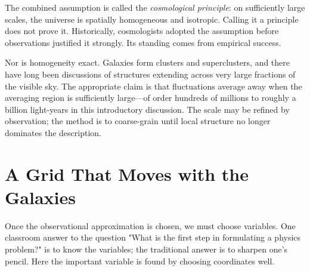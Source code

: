 \begin{classroomqa}
\end{classroomqa}

The combined assumption is called the \emph{cosmological principle}: on sufficiently large scales, the universe is spatially homogeneous and isotropic. Calling it a principle does not prove it. Historically, cosmologists adopted the assumption before observations justified it strongly. Its standing comes from empirical success.

Nor is homogeneity exact. Galaxies form clusters and superclusters, and there have long been discussions of structures extending across very large fractions of the visible sky. The appropriate claim is that fluctuations average away when the averaging region is sufficiently large---of order hundreds of millions to roughly a billion light-years in this introductory discussion. The scale may be refined by observation; the method is to coarse-grain until local structure no longer dominates the description.

\begin{classroomqa}
\end{classroomqa}

\section{A Grid That Moves with the Galaxies}

Once the observational approximation is chosen, we must choose variables. One classroom answer to the question "What is the first step in formulating a physics problem?" is to know the variables; the traditional answer is to sharpen one's pencil. Here the important variable is found by choosing coordinates well.

